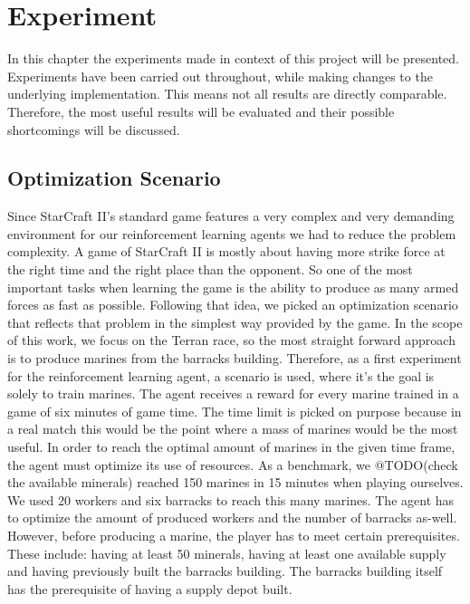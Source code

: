 \documentclass[12pt,a4paper]{article}
\begin{document}
\section{Experiment}
In this chapter the experiments made in context of this project will be presented. Experiments have been carried out throughout, while making changes to the underlying implementation. This means not all results are directly comparable. Therefore, the most useful results will be evaluated and their possible shortcomings will be discussed.
\subsection{Optimization Scenario}\label{sec:scenario}
Since StarCraft II's standard game features a very complex and very demanding environment for our reinforcement learning agents we had to reduce the problem complexity.
A game of StarCraft II is mostly about having more strike force at the right time and the right place than the opponent.
So one of the most important tasks when learning the game is the ability to produce as many armed forces as fast as possible. Following that idea, we picked an optimization scenario that reflects that problem in the simplest way provided by the game.
In the scope of this work, we focus on the Terran race, so the most straight forward approach is to produce marines from the barracks building.
Therefore, as a first experiment for the reinforcement learning agent, a scenario is used, where it's the goal is solely to train marines.
The agent receives a reward for every marine trained in a game of six minutes of game time. The time limit is picked on purpose because in a real match this would be the point where a mass of marines would be the most useful.
In order to reach the optimal amount of marines in the given time frame, the agent must optimize its use of resources.
As a benchmark, we @TODO(check the available minerals) reached 150 marines in 15 minutes when playing ourselves. We used 20 workers and six barracks to reach this many marines.
The agent has to optimize the amount of produced workers and the number of barracks as-well.
However, before producing a marine, the player has to meet certain prerequisites. These include: having at least 50 minerals, having at least one available supply and having previously built the barracks building. The barracks building itself has the prerequisite of having a supply depot built.
\end{document}
